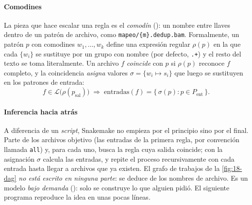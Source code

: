 \paragraph{Comodines} La pieza que hace escalar una regla es el \emph{comodín} (): un nombre entre llaves dentro de un patrón de archivo, como \texttt{mapeo/\{m\}.dedup.bam}. Formalmente, un patrón $p$ con comodines $w_1,\dots,w_k$ define una expresión regular $\rho(p)$ en la que cada $\{w_i\}$ se sustituye por un grupo con nombre (por defecto, \texttt{.+}) y el resto del texto se toma literalmente. Un archivo $f$ \emph{coincide} con $p$ si $\rho(p)$ reconoce $f$ completo, y la coincidencia \emph{asigna} valores $\sigma=\{w_i\mapsto s_i\}$ que luego se sustituyen en los patrones de entrada:
\begin{equation}\label{eq:18-comodin}
f \in \mathcal{L}\big(\rho(p_{\text{sal}})\big) \;\Longrightarrow\; \text{entradas}(f) = \big\{\,\sigma(p) : p\in P_{\text{ent}}\,\big\}.
\end{equation}

\begin{simbolos}
\end{simbolos}

\paragraph{Inferencia hacia atrás} A diferencia de un \emph{script}, Snakemake no empieza por el principio sino por el final. Parte de los archivos objetivo (las entradas de la primera regla, por convención llamada \texttt{all}) y, para cada uno, busca la regla cuya salida coincide; con la asignación $\sigma$ calcula las entradas, y repite el proceso recursivamente con cada entrada hasta llegar a archivos que ya existen. El grafo de trabajos de la \cref{fig:18-dag} \emph{no está escrito en ninguna parte}: se deduce de los nombres de archivo. Es un modelo \emph{bajo demanda} (): solo se construye lo que alguien pidió. El siguiente programa reproduce la idea en unas pocas líneas.

